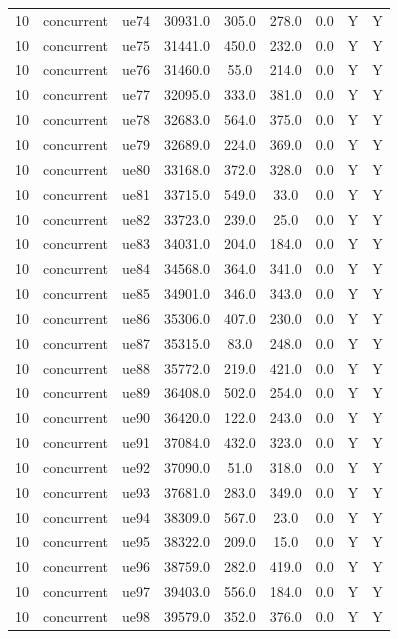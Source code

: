 \begin{table}[ht]
\begin{tabular}{|c|c|c|c|c|c|c|c|c|}
10 & concurrent & ue74 & 30931.0 & 305.0 & 278.0 & 0.0 & Y & Y \\
10 & concurrent & ue75 & 31441.0 & 450.0 & 232.0 & 0.0 & Y & Y \\
10 & concurrent & ue76 & 31460.0 & 55.0 & 214.0 & 0.0 & Y & Y \\
10 & concurrent & ue77 & 32095.0 & 333.0 & 381.0 & 0.0 & Y & Y \\
10 & concurrent & ue78 & 32683.0 & 564.0 & 375.0 & 0.0 & Y & Y \\
10 & concurrent & ue79 & 32689.0 & 224.0 & 369.0 & 0.0 & Y & Y \\
10 & concurrent & ue80 & 33168.0 & 372.0 & 328.0 & 0.0 & Y & Y \\
10 & concurrent & ue81 & 33715.0 & 549.0 & 33.0 & 0.0 & Y & Y \\
10 & concurrent & ue82 & 33723.0 & 239.0 & 25.0 & 0.0 & Y & Y \\
10 & concurrent & ue83 & 34031.0 & 204.0 & 184.0 & 0.0 & Y & Y \\
10 & concurrent & ue84 & 34568.0 & 364.0 & 341.0 & 0.0 & Y & Y \\
10 & concurrent & ue85 & 34901.0 & 346.0 & 343.0 & 0.0 & Y & Y \\
10 & concurrent & ue86 & 35306.0 & 407.0 & 230.0 & 0.0 & Y & Y \\
10 & concurrent & ue87 & 35315.0 & 83.0 & 248.0 & 0.0 & Y & Y \\
10 & concurrent & ue88 & 35772.0 & 219.0 & 421.0 & 0.0 & Y & Y \\
10 & concurrent & ue89 & 36408.0 & 502.0 & 254.0 & 0.0 & Y & Y \\
10 & concurrent & ue90 & 36420.0 & 122.0 & 243.0 & 0.0 & Y & Y \\
10 & concurrent & ue91 & 37084.0 & 432.0 & 323.0 & 0.0 & Y & Y \\
10 & concurrent & ue92 & 37090.0 & 51.0 & 318.0 & 0.0 & Y & Y \\
10 & concurrent & ue93 & 37681.0 & 283.0 & 349.0 & 0.0 & Y & Y \\
10 & concurrent & ue94 & 38309.0 & 567.0 & 23.0 & 0.0 & Y & Y \\
10 & concurrent & ue95 & 38322.0 & 209.0 & 15.0 & 0.0 & Y & Y \\
10 & concurrent & ue96 & 38759.0 & 282.0 & 419.0 & 0.0 & Y & Y \\
10 & concurrent & ue97 & 39403.0 & 556.0 & 184.0 & 0.0 & Y & Y \\
10 & concurrent & ue98 & 39579.0 & 352.0 & 376.0 & 0.0 & Y & Y \\

\end{tabular}
\end{table}
